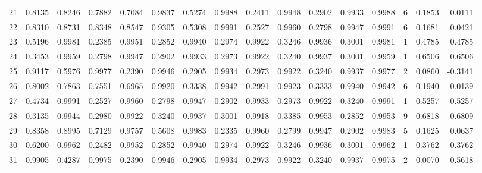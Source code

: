 \begin{tabular}{lrrrrrrrrrrrrrrr}
21  &      0.8135 &  0.8246 &  0.7882 &  0.7084 &  0.9837 &  0.5274 &  0.9988 &  0.2411 &  0.9948 &  0.2902 &   0.9933 &     0.9988 &      6 &                    0.1853 &                     0.0111 \\
22  &      0.8310 &  0.8731 &  0.8348 &  0.8547 &  0.9305 &  0.5308 &  0.9991 &  0.2527 &  0.9960 &  0.2798 &   0.9947 &     0.9991 &      6 &                    0.1681 &                     0.0421 \\
23  &      0.5196 &  0.9981 &  0.2385 &  0.9951 &  0.2852 &  0.9940 &  0.2974 &  0.9922 &  0.3246 &  0.9936 &   0.3001 &     0.9981 &      1 &                    0.4785 &                     0.4785 \\
24  &      0.3453 &  0.9959 &  0.2798 &  0.9947 &  0.2902 &  0.9933 &  0.2973 &  0.9922 &  0.3240 &  0.9937 &   0.3001 &     0.9959 &      1 &                    0.6506 &                     0.6506 \\
25  &      0.9117 &  0.5976 &  0.9977 &  0.2390 &  0.9946 &  0.2905 &  0.9934 &  0.2973 &  0.9922 &  0.3240 &   0.9937 &     0.9977 &      2 &                    0.0860 &                    -0.3141 \\
26  &      0.8002 &  0.7863 &  0.7551 &  0.6965 &  0.9920 &  0.3338 &  0.9942 &  0.2991 &  0.9923 &  0.3333 &   0.9940 &     0.9942 &      6 &                    0.1940 &                    -0.0139 \\
27  &      0.4734 &  0.9991 &  0.2527 &  0.9960 &  0.2798 &  0.9947 &  0.2902 &  0.9933 &  0.2973 &  0.9922 &   0.3240 &     0.9991 &      1 &                    0.5257 &                     0.5257 \\
28  &      0.3135 &  0.9944 &  0.2980 &  0.9922 &  0.3240 &  0.9937 &  0.3001 &  0.9918 &  0.3385 &  0.9953 &   0.2852 &     0.9953 &      9 &                    0.6818 &                     0.6809 \\
29  &      0.8358 &  0.8995 &  0.7129 &  0.9757 &  0.5608 &  0.9983 &  0.2335 &  0.9960 &  0.2799 &  0.9947 &   0.2902 &     0.9983 &      5 &                    0.1625 &                     0.0637 \\
30  &      0.6200 &  0.9962 &  0.2482 &  0.9952 &  0.2852 &  0.9940 &  0.2974 &  0.9922 &  0.3246 &  0.9936 &   0.3001 &     0.9962 &      1 &                    0.3762 &                     0.3762 \\
31  &      0.9905 &  0.4287 &  0.9975 &  0.2390 &  0.9946 &  0.2905 &  0.9934 &  0.2973 &  0.9922 &  0.3240 &   0.9937 &     0.9975 &      2 &                    0.0070 &                    -0.5618 \\

\end{tabular}
